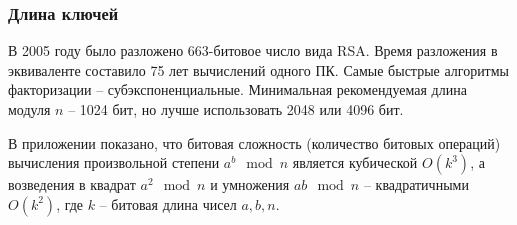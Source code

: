 \subsubsection{Длина ключей}

В 2005 году было разложено 663-битовое число вида RSA. Время разложения в эквиваленте составило 75 лет вычислений одного ПК. Самые быстрые алгоритмы факторизации -- субэкспоненциальные. Минимальная рекомендуемая длина модуля $n$ -- 1024 бит, но лучше использовать 2048 или 4096 бит.

В приложении показано, что битовая сложность (количество битовых операций) вычисления произвольной степени $a^b \mod n$ является кубической $O(k^3)$, а возведения в квадрат $a^2 \mod n$ и умножения $a b \mod n$ -- квадратичными $O(k^2)$, где $k$ -- битовая длина чисел $a,b,n$.

